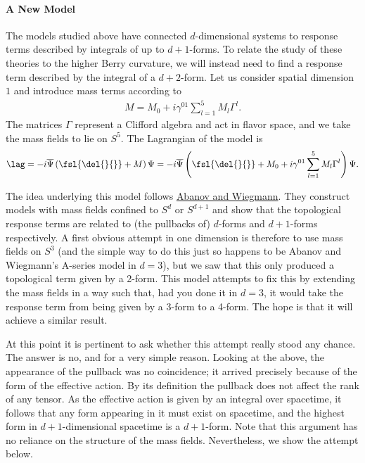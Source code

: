\paragraph{A New Model}
The models studied above have connected $d$-dimensional systems to response terms described by integrals of up to $d + 1$-forms. To relate the study of these theories to the higher Berry curvature, we will instead need to find a response term described by the integral of a $d + 2$-form. Let us consider spatial dimension $1$ and introduce mass terms according to
\begin{align*}
	M = M_{0} + i\gamma^{01}\sum\limits_{l = 1}^{5}M_{l}\Gamma^{l}.
\end{align*}
The matrices $\Gamma$ represent a Clifford algebra and act in flavor space, and we take the mass fields to lie on $S^{5}$. The Lagrangian of the model is
\begin{align*}
	\lag = -i\overline{\Psi}\left(\fsl{\del{}{}} + M\right)\Psi = -i\overline{\Psi}\left(\fsl{\del{}{}} + M_{0} + i\gamma^{01}\sum\limits_{l = 1}^{5}M_{l}\Gamma^{l}\right)\Psi.
\end{align*}

The idea underlying this model follows \href{https://arxiv.org/pdf/hep-th/9911025.pdf}{Abanov and Wiegmann}. They construct models with mass fields confined to $S^{d}$ or $S^{d + 1}$ and show that the topological response terms are related to (the pullbacks of) $d$-forms and $d + 1$-forms respectively. A first obvious attempt in one dimension is therefore to use mass fields on $S^{3}$ (and the simple way to do this just so happens to be Abanov and Wiegmann's A-series model in $d = 3$), but we saw that this only produced a topological term given by a 2-form. This model attempts to fix this by extending the mass fields in a way such that, had you done it in $d = 3$, it would take the response term from being given by a 3-form to a 4-form. The hope is that it will achieve a similar result.

At this point it is pertinent to ask whether this attempt really stood any chance. The answer is no, and for a very simple reason. Looking at the above, the appearance of the pullback was no coincidence; it arrived precisely because of the form of the effective action. By its definition the pullback does not affect the rank of any tensor. As the effective action is given by an integral over spacetime, it follows that any form appearing in it must exist on spacetime, and the highest form in $d + 1$-dimensional spacetime is a $d + 1$-form. Note that this argument has no reliance on the structure of the mass fields. Nevertheless, we show the attempt below.

